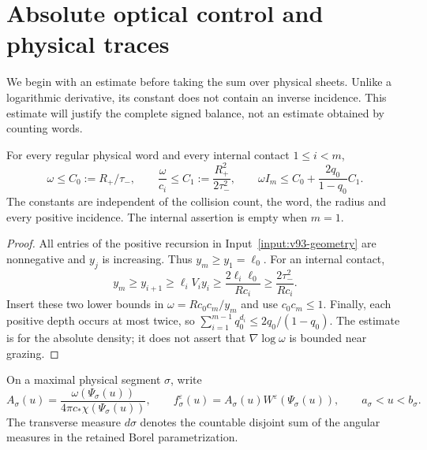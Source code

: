 \section{Absolute optical control and physical traces}
\label{sec:v93-traces}
We begin with an estimate before taking the sum over physical sheets.
Unlike a logarithmic derivative, its constant does not contain an
inverse incidence. This estimate will justify the complete signed
balance, not an estimate obtained by counting words.

\begin{lemma}
\label{lem:v93-cancellation}
For every regular physical word and every internal contact $1\le i<m$,
\begin{equation}\label{eq:v93-cancellation}
 \omega\le C_0:=R_+/\tau_-,\qquad
 \frac{\omega}{c_i}\le C_1:=\frac{R_+^2}{2\tau_-^2},\qquad
 \omega I_m\le C_0+\frac{2q_0}{1-q_0}C_1.
\end{equation}
The constants are independent of the collision count, the word,
the radius and every positive incidence. The internal assertion is
empty when $m=1$.
\end{lemma}
\begin{proof}
All entries of the positive recursion in Input~\ref{input:v93-geometry}
are nonnegative and $y_j$ is increasing. Thus $y_m\ge y_1=\ell_0$.
For an internal contact,
\[
 y_m\ge y_{i+1}\ge \ell_i V_i y_i
          \ge \frac{2\ell_i\ell_0}{Rc_i}
          \ge \frac{2\tau_-^2}{Rc_i}.
\]
Insert these two lower bounds in $\omega=Rc_0c_m/y_m$ and use
$c_0c_m\le1$. Finally, each positive depth occurs at most twice, so
$\sum_{i=1}^{m-1}q_0^{d_i}\le2q_0/(1-q_0)$.
The estimate is for the absolute density; it does not assert that
$\nabla\log\omega$ is bounded near grazing.
\end{proof}

On a maximal physical segment $\sigma$, write
\[
 A_\sigma(u)=\frac{\omega(\Psi_\sigma(u))}
                   {4\pi c_*\chi(\Psi_\sigma(u))},\qquad
 f_\sigma^\varepsilon(u)=A_\sigma(u)W^\varepsilon(\Psi_\sigma(u)),
 \qquad a_\sigma<u<b_\sigma.
\]
The transverse measure $d\sigma$ denotes the countable disjoint sum
of the angular measures in the retained Borel parametrization.

